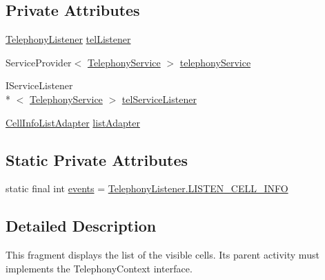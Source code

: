 \subsection*{Private Attributes}
\begin{DoxyCompactItemize}
\item 
\hyperlink{classcom_1_1qualoutdoor_1_1recorder_1_1telephony_1_1TelephonyListener}{Telephony\-Listener} \hyperlink{classcom_1_1qualoutdoor_1_1recorder_1_1home_1_1NeighborsFragment_ae1f6f2467a89a24ccbe71cd88ed425b7}{tel\-Listener}
\item 
Service\-Provider$<$ \hyperlink{classcom_1_1qualoutdoor_1_1recorder_1_1telephony_1_1TelephonyService}{Telephony\-Service} $>$ \hyperlink{classcom_1_1qualoutdoor_1_1recorder_1_1home_1_1NeighborsFragment_aac56a378ef0f696f5f1411d06a9bb519}{telephony\-Service}
\item 
I\-Service\-Listener\\*
$<$ \hyperlink{classcom_1_1qualoutdoor_1_1recorder_1_1telephony_1_1TelephonyService}{Telephony\-Service} $>$ \hyperlink{classcom_1_1qualoutdoor_1_1recorder_1_1home_1_1NeighborsFragment_a8b5037922ec941ed326b0d74ce57e4c6}{tel\-Service\-Listener}
\item 
\hyperlink{classcom_1_1qualoutdoor_1_1recorder_1_1home_1_1CellInfoListAdapter}{Cell\-Info\-List\-Adapter} \hyperlink{classcom_1_1qualoutdoor_1_1recorder_1_1home_1_1NeighborsFragment_afd33755a7a58c67026151f5ce54a124e}{list\-Adapter}
\end{DoxyCompactItemize}
\subsection*{Static Private Attributes}
\begin{DoxyCompactItemize}
\item 
static final int \hyperlink{classcom_1_1qualoutdoor_1_1recorder_1_1home_1_1NeighborsFragment_a93d9c9e5a667b7404b65bee5e0015fe5}{events} = \hyperlink{classcom_1_1qualoutdoor_1_1recorder_1_1telephony_1_1TelephonyListener_aa73af11a2afc13c7bfb8ce7e58b45f69}{Telephony\-Listener.\-L\-I\-S\-T\-E\-N\-\_\-\-C\-E\-L\-L\-\_\-\-I\-N\-F\-O}
\end{DoxyCompactItemize}


\subsection{Detailed Description}
This fragment displays the list of the visible cells. Its parent activity must implements the Telephony\-Context interface.

